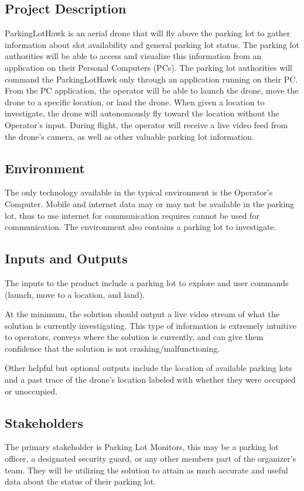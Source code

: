 \documentclass{article}
\begin{document}
\subsection{Project Description}

ParkingLotHawk is an aerial drone that will fly above the parking lot to gather information about slot availability and general parking lot status. The parking lot authorities will be able to access and visualize this information from an application on their Personal Computers (PCs). The parking lot authorities will command the ParkingLotHawk  only through an application running on their PC. From the PC application, the operator will be able to launch the drone, move the drone to a specific location, or land the drone. When given a location to investigate, the drone will autonomously fly toward the location without the Operator's input. During flight, the operator will receive a live video feed from the drone's camera, as well as other valuable parking lot information.

\subsection{Environment}
The only technology available in the typical environment is the Operator's Computer. Mobile and internet data may or may not be available in the parking lot, thus to use internet for communication requires cannot be used for communication. The environment also contains a parking lot to investigate. 

\subsection{Inputs and Outputs}

The inputs to the product include a parking lot to explore and user commands (launch, move to a location, and land).

 At the minimum, the solution should output a live video stream of what the solution is currently investigating. This type of information is extremely intuitive to operators, conveys where the solution is currently, and can give them confidence that the solution is not crashing/malfunctioning.  

Other helpful but optional outputs include the location of available parking lots and a past trace of the drone's location labeled with whether they were occupied or unoccupied.

\subsection{Stakeholders}
The primary stakeholder is Parking Lot Monitors, this may be a parking lot officer, a designated security guard, or any other members part of the organizer's team. They will be utilizing the solution to attain as much accurate and useful data about the status of their parking lot.
\end{document}

